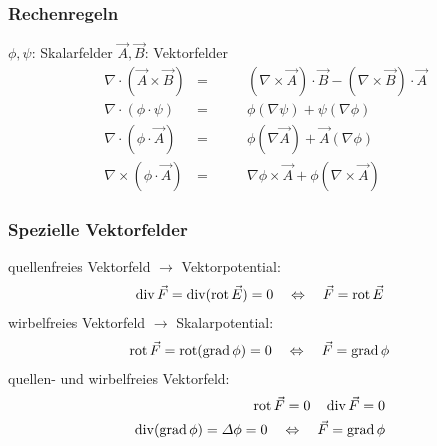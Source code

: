 \subsubsection{Rechenregeln}
$\phi, \psi$: Skalarfelder \qquad $\vec{A}, \vec{B}$: Vektorfelder
\begin{align*}
     & \nabla \cdot (\vec{A} \times \vec{B}) & = & \qquad (\nabla \times \vec{A})\cdot\vec{B} - (\nabla\times\vec{B})\cdot\vec{A} \\
     & \nabla \cdot (\phi \cdot \psi)        & = & \qquad \phi (\nabla \psi) + \psi( \nabla \phi)                                  \\
     & \nabla \cdot (\phi \cdot \vec{A})           & = & \qquad \phi (\nabla \vec{A}) + \vec{A}(\nabla \phi)                             \\
     & \nabla \times (\phi \cdot \vec{A})          & = & \qquad \nabla \phi \times \vec{A} + \phi (\nabla \times \vec{A})                        
\end{align*}

\subsubsection{Spezielle Vektorfelder}
quellenfreies Vektorfeld $\rightarrow$ Vektorpotential:
\begin{align*}
\operatorname{div} \vec{F} = \operatorname{div} (\operatorname{rot} \vec{E}) = 0 \quad \Leftrightarrow \quad  \vec{F} = \operatorname{rot} \vec{E}
\end{align*}
wirbelfreies Vektorfeld $\rightarrow$ Skalarpotential: 
\begin{align*}
    \operatorname{rot} \vec{F} = \operatorname{rot} (\operatorname{grad} \phi) = 0 \quad \Leftrightarrow \quad  \vec{F} = \operatorname{grad} \phi
\end{align*}
quellen- und wirbelfreies Vektorfeld:
\begin{align*}
    \operatorname{rot} \vec{F} = 0 \quad \operatorname{div} \vec{F} = 0\\
    \operatorname{div} (\operatorname{grad} \phi) = \varDelta \phi = 0 \quad \Leftrightarrow \quad  \vec{F} = \operatorname{grad} \phi
\end{align*}


